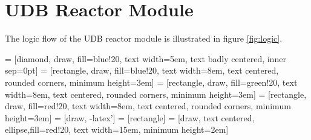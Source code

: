 \documentclass{article}
\begin{document}
\section{\gls{UDB} Reactor Module}

The logic flow of the UDB reactor module is illustrated in figure \ref{fig:logic}.

 = [diamond, draw, fill=blue!20, 
    text width=5em, text badly centered,  inner sep=0pt]
 = [rectangle, draw, fill=blue!20, 
    text width=8em, text centered, rounded corners, minimum height=3em]
 = [rectangle, draw, fill=green!20, 
    text width=8em, text centered, rounded corners, minimum height=3em]
 = [rectangle, draw, fill=red!20, 
    text width=8em, text centered, rounded corners, minimum height=3em]
 = [draw, -latex']
 = [rectangle]
 = [draw, text centered, ellipse,fill=red!20, text width=15em,
    minimum height=2em]

\usetikzlibrary{calc}
\end{document}
